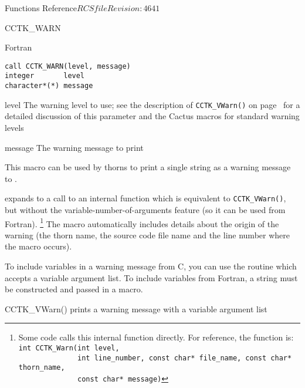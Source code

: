 \begin{cactuspart}{ Functions Reference}{$RCSfile$}{$Revision: 4641 $}
\begin{FunctionDescription}{CCTK\_WARN}
\begin{SynopsisSection}
\begin{Synopsis}{Fortran}
\begin{verbatim}
call CCTK_WARN(level, message)
integer       level
character*(*) message
\end{verbatim}
\end{Synopsis}
\end{SynopsisSection}

\begin{ParameterSection}
\begin{Parameter}{level}
The warning level to use;
see the description of \verb|CCTK_VWarn()| on page~\pageref{CCTK-VInfo}
for a detailed discussion of this parameter and the Cactus macros
for standard warning levels
\end{Parameter}
\begin{Parameter}{message}
The warning message to print
\end{Parameter}
\end{ParameterSection}

\begin{Discussion}
This macro can be used by thorns to print a single string as a warning message
to .

 expands to a call to an internal
function which is equivalent to \verb|CCTK_VWarn()|, but without the
variable-number-of-arguments feature (so it can be used from Fortran).%
\footnote{%
         Some code calls this internal function directly.
         For reference, the function is:\\
         \texttt{\hbox{}int CCTK\_Warn(int level,}\\
         \texttt{\hbox{}~~~~~~~~~~~~~~int line\_number, const char* file\_name, const char* thorn\_name,}\\
         \texttt{\hbox{}~~~~~~~~~~~~~~const char* message)}
         }%
{}  The macro automatically includes details about the origin of the warning
(the thorn name, the source code file name and the line number where the macro
occurs).

To include variables in a warning message from C, you can use the routine
 which accepts a variable argument list.
To include variables from Fortran, a string must be constructed and passed
in a  macro.
\end{Discussion}

\begin{SeeAlsoSection}
\begin{SeeAlso}{CCTK\_VWarn()}
prints a warning message with a variable argument list
\end{SeeAlso}
\end{SeeAlsoSection}


\end{FunctionDescription}
\end{cactuspart}
